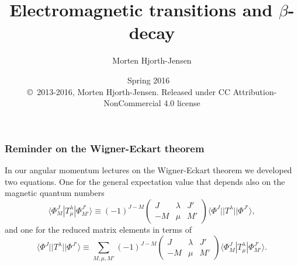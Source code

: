 \documentclass{beamer}
\begin{document}

\newcommand{\exercisesection}[1]{\subsection*{#1}}







\title{Electromagnetic transitions and $\beta$-decay}


\author{Morten Hjorth-Jensen}

\date{Spring 2016
\ \\ 
{\tiny \copyright\ 2013-2016, Morten Hjorth-Jensen. Released under CC Attribution-NonCommercial 4.0 license}
}

\begin{frame}
\titlepage
\end{frame}

\begin{frame}
\frametitle{Reminder on the Wigner-Eckart theorem}

\begin{block}{}
In our angular momentum lectures on the Wigner-Eckart theorem we developed two equations. 
One for the general expectation value that depends also on the magnetic quantum numbers  
\[
\langle \Phi^J_M|T^{\lambda}_{\mu}|\Phi^{J'}_{M'}\rangle\equiv(-1)^{J-M}\left(\begin{array}{ccc}  J & \lambda & J' \\ -M & \mu & M'\end{array}\right)\langle \Phi^J||T^{\lambda}||\Phi^{J'}\rangle,
\]
and one for the reduced matrix elements in terms of 
\[
\langle \Phi^J||T^{\lambda}||\Phi^{J'}\rangle\equiv\sum_{M,\mu,M'}(-1)^{J-M}\left(\begin{array}{ccc}  J & \lambda & J' \\ -M & \mu & M'\end{array}\right)\langle \Phi^J_M|T^{\lambda}_{\mu}|\Phi^{J'}_{M'}\rangle.
\]
\end{block}
\end{frame}
\end{document}
